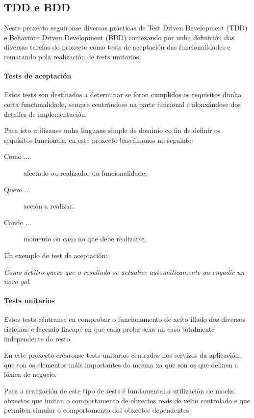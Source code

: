    \subsection{TDD e BDD}
  Neste proxecto seguironse diversas prácticas de Test Driven Development 
(TDD)\cite{book:cleancode} e Behaviour Driven Development 
(BDD)\cite{book:cucumber} comezando por unha definición das 
diversas tarefas do proxecto como tests de aceptación das funcionalidades e 
rematando pola realización de tests unitarios.

      \paragraph{Tests de aceptación} Estos tests son destinados a determinar 
se foron cumplidos os requisitos dunha certa funcionalidade, sempre 
centrándose na parte funcional e alonxándose dos detalles de implementación.

      Para isto utilízanse unha linguaxe simple de dominio co fin de definir os 
requisitos funcionais, en este proxecto baseámonos no seguinte:

        \begin{description}
         \item [Como ....] afectado ou realizador da funcionalidade.
         \item [Quero ...] acción a realizar.
         \item [Cando ...] momento ou caso no que debe realizarse.
        \end{description}

        Un exemplo de test de aceptación:

        \emph{Como árbitro quero que o resultado se actualice automáticamente 
ao engadir un novo gol}.

      \paragraph{Tests unitarios} Estos tests céntranse en comprobar o 
funcionamento de xeito illado dos diversos sistemas e facendo fincapé en que 
cada proba sexa un caso totalmente independente do resto.

      En este proxecto crearonse tests unitarios centrados nos servizos da 
aplicación, que son os elementos máis importantes da mesma xa que son os que 
definen a lóxica de negocio.

      Para a realización de este tipo de tests é fundamental a utilización de 
mocks, obxectos que imitan o comportamento de obxectos reais de xeito 
controlado e que permiten simular o comportamento dos obxectos dependentes.

